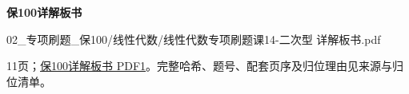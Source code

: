 \documentclass[UTF8,fontset=fandol,11pt,a4paper]{ctexart}
\newcommand{\source}[1]{{\footnotesize\color{Muted}#1\par}}
\begin{document}
\textbf{保100详解板书}\par
02\_专项刷题\_保100/线性代数/线性代数专项刷题课14-二次型 详解板书.pdf\par
\source{11页；\href{file:///Users/skyintelligence/Desktop/\%E5\%BE\%97\%E8\%AF\%BB\%E4\%B8\%AA\%E7\%A0\%94-\%E5\%8C\%97\%E5\%A4\%A7\%E8\%BD\%AF\%E5\%BE\%AE/\%E6\%95\%B0\%E5\%AD\%A6\%20150/02\_\%E4\%B8\%93\%E9\%A1\%B9\%E5\%88\%B7\%E9\%A2\%98\_\%E4\%BF\%9D100/\%E7\%BA\%BF\%E6\%80\%A7\%E4\%BB\%A3\%E6\%95\%B0/\%E7\%BA\%BF\%E6\%80\%A7\%E4\%BB\%A3\%E6\%95\%B0\%E4\%B8\%93\%E9\%A1\%B9\%E5\%88\%B7\%E9\%A2\%98\%E8\%AF\%BE14-\%E4\%BA\%8C\%E6\%AC\%A1\%E5\%9E\%8B\%20\%E8\%AF\%A6\%E8\%A7\%A3\%E6\%9D\%BF\%E4\%B9\%A6.pdf\#page=1}{保100详解板书 PDF1}。完整哈希、题号、配套页序及归位理由见来源与归位清单。}
\end{document}
